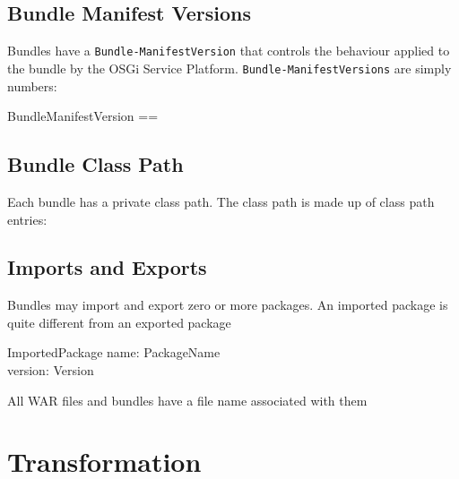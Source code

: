 \documentclass[a4paper,12pt]{article}
\begin{document}
\subsection{Bundle Manifest Versions}

Bundles have a {\tt Bundle-ManifestVersion} that controls the behaviour applied to the bundle by the OSGi Service Platform. {\tt Bundle-ManifestVersions} are simply numbers:

\begin{zed}
	BundleManifestVersion == \nat
\end{zed}

\subsection{Bundle Class Path}

Each bundle has a private class path. The class path is made up of class path entries:

\begin{zed}
	[BundleClassPathEntry]
\end{zed}

\subsection{Imports and Exports}

Bundles may import and export zero or more packages. An imported package is quite different from an exported package

\begin{zed}
	[PackageName]
\end{zed}

\begin{schema}{ImportedPackage}
name: PackageName \\
version: Version
\end{schema}

\begin{zed}
	[ExportedPackage]
\end{zed}

All WAR files and bundles have a file name associated with them

\begin{zed}
	[FileName]
\end{zed}

\clearpage
\section{Transformation}
\label{cha:transformation}
\end{document}
